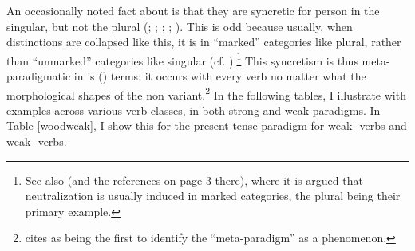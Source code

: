 \documentclass[output=paper,colorlinks,citecolor=brown,
]{langscibook}
\begin{document}
An occasionally noted fact about \stvs is that they are syncretic for person in the singular, but not the plural (\citealt[100]{Einarsson:1949xt}; \citealt[434-440]{Thomson:1987bn}; \citealt[242]{Anderson:1990sm}; \citealt[fn2]{Taraldsen:1995om}; \citealt[270]{SigurTHsson:2008dm}). This is odd because usually, when distinctions are collapsed like this, it is in ``marked'' categories like plural, rather than ``unmarked'' categories like singular (cf. \citealt[334]{Ottosson:2008b}).\footnote{See also \cite{aalberse2010:ab} (and the references on page 3 there), where it is argued that neutralization is usually induced in marked categories, the plural being their primary example.}  This syncretism is thus meta-paradigmatic in \citeauthor{Harley:2008ul}'s (\citeyear{Harley:2008ul}) terms: it occurs with every verb no matter what the morphological shapes of the non\stin{} variant.\footnote{\cite{Harley:2008ul} cites \cite{Williams:1994zd} as being the first to identify the ``meta-paradigm'' as a phenomenon.}
 In the following tables, I illustrate with examples across various verb classes, in both strong and weak paradigms. In Table \ref{woodweak}, I show this for the present tense paradigm for weak -verbs and weak -verbs.
\end{document}
